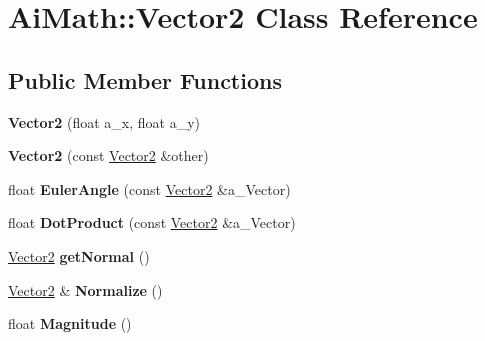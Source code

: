 \hypertarget{class_ai_math_1_1_vector2}{\section{Ai\+Math\+:\+:Vector2 Class Reference}
\label{class_ai_math_1_1_vector2}
}
\subsection*{Public Member Functions}
\begin{DoxyCompactItemize}
\item 
\hypertarget{class_ai_math_1_1_vector2_ab596a39a34690e5faed023c8a981e559}{{\bfseries Vector2} (float a\+\_\+x, float a\+\_\+y)}\label{class_ai_math_1_1_vector2_ab596a39a34690e5faed023c8a981e559}

\item 
\hypertarget{class_ai_math_1_1_vector2_ac99b49827b0460dffa3c5e460c08b723}{{\bfseries Vector2} (const \hyperlink{class_ai_math_1_1_vector2}{Vector2} \&other)}\label{class_ai_math_1_1_vector2_ac99b49827b0460dffa3c5e460c08b723}

\item 
\hypertarget{class_ai_math_1_1_vector2_aa84960c543b2374169adfebb27e0bfaa}{float {\bfseries Euler\+Angle} (const \hyperlink{class_ai_math_1_1_vector2}{Vector2} \&a\+\_\+\+Vector)}\label{class_ai_math_1_1_vector2_aa84960c543b2374169adfebb27e0bfaa}

\item 
\hypertarget{class_ai_math_1_1_vector2_ad360b404251e6e457ad345dc3cb828de}{float {\bfseries Dot\+Product} (const \hyperlink{class_ai_math_1_1_vector2}{Vector2} \&a\+\_\+\+Vector)}\label{class_ai_math_1_1_vector2_ad360b404251e6e457ad345dc3cb828de}

\item 
\hypertarget{class_ai_math_1_1_vector2_a24fb31ad2a3b4223e9c9d9fbedb02609}{\hyperlink{class_ai_math_1_1_vector2}{Vector2} {\bfseries get\+Normal} ()}\label{class_ai_math_1_1_vector2_a24fb31ad2a3b4223e9c9d9fbedb02609}

\item 
\hypertarget{class_ai_math_1_1_vector2_a49f5ae655c1a30b6f762cb12edaedde4}{\hyperlink{class_ai_math_1_1_vector2}{Vector2} \& {\bfseries Normalize} ()}\label{class_ai_math_1_1_vector2_a49f5ae655c1a30b6f762cb12edaedde4}

\item 
\hypertarget{class_ai_math_1_1_vector2_ab8dcaefd594fe0e829f924626a357b4c}{float {\bfseries Magnitude} ()}\label{class_ai_math_1_1_vector2_ab8dcaefd594fe0e829f924626a357b4c}


\end{DoxyCompactItemize}

